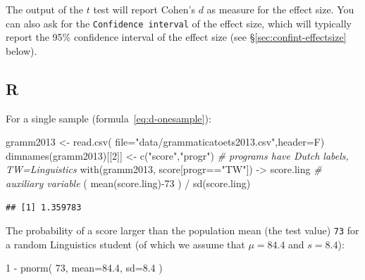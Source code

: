 \documentclass[
]{book}
\newenvironment{Shaded}{\begin{snugshade}}{\end{snugshade}}
\newcommand{\AttributeTok}[1]{\textcolor[rgb]{0.77,0.63,0.00}{#1}}
\newcommand{\CommentTok}[1]{\textcolor[rgb]{0.56,0.35,0.01}{\textit{#1}}}
\newcommand{\DecValTok}[1]{\textcolor[rgb]{0.00,0.00,0.81}{#1}}
\newcommand{\FloatTok}[1]{\textcolor[rgb]{0.00,0.00,0.81}{#1}}
\newcommand{\FunctionTok}[1]{\textcolor[rgb]{0.00,0.00,0.00}{#1}}
\newcommand{\NormalTok}[1]{#1}
\newcommand{\OtherTok}[1]{\textcolor[rgb]{0.56,0.35,0.01}{#1}}
\newcommand{\SpecialCharTok}[1]{\textcolor[rgb]{0.00,0.00,0.00}{#1}}
\newcommand{\StringTok}[1]{\textcolor[rgb]{0.31,0.60,0.02}{#1}}
\begin{document}
The output of the \(t\) test will report Cohen's \(d\) as measure for the effect size. You can also ask for the \texttt{Confidence\ interval} of the effect size, which will typically report the 95\% confidence interval of the effect size (see §\ref{sec:confint-effectsize} below).

\hypertarget{r-14}{%
\subsection{R}\label{r-14}}

For a single sample
(formula~\eqref{eq:d-onesample}):\\

\begin{Shaded}
\begin{Highlighting}[]
\NormalTok{gramm2013 }\OtherTok{\textless{}{-}} \FunctionTok{read.csv}\NormalTok{( }\AttributeTok{file=}\StringTok{"data/grammaticatoets2013.csv"}\NormalTok{,}\AttributeTok{header=}\NormalTok{F)}
\FunctionTok{dimnames}\NormalTok{(gramm2013)[[}\DecValTok{2}\NormalTok{]] }\OtherTok{\textless{}{-}} \FunctionTok{c}\NormalTok{(}\StringTok{"score"}\NormalTok{,}\StringTok{"progr"}\NormalTok{)}
\CommentTok{\# programs have Dutch labels, TW=Linguistics}
\FunctionTok{with}\NormalTok{(gramm2013, score[progr}\SpecialCharTok{==}\StringTok{"TW"}\NormalTok{]) }\OtherTok{{-}\textgreater{}}\NormalTok{ score.ling}
\CommentTok{\# auxiliary variable}
\NormalTok{( }\FunctionTok{mean}\NormalTok{(score.ling)}\SpecialCharTok{{-}}\DecValTok{73}\NormalTok{ ) }\SpecialCharTok{/} \FunctionTok{sd}\NormalTok{(score.ling) }
\end{Highlighting}
\end{Shaded}

\begin{verbatim}
## [1] 1.359783
\end{verbatim}

The probability of a score larger than the population mean (the test value) \texttt{73} for a random Linguistics
student (of which we assume that \(\mu=84.4\) and \(s=8.4\)):

\begin{Shaded}
\begin{Highlighting}[]
\DecValTok{1} \SpecialCharTok{{-}} \FunctionTok{pnorm}\NormalTok{( }\DecValTok{73}\NormalTok{, }\AttributeTok{mean=}\FloatTok{84.4}\NormalTok{, }\AttributeTok{sd=}\FloatTok{8.4}\NormalTok{ ) }
\end{Highlighting}
\end{Shaded}
\end{document}
